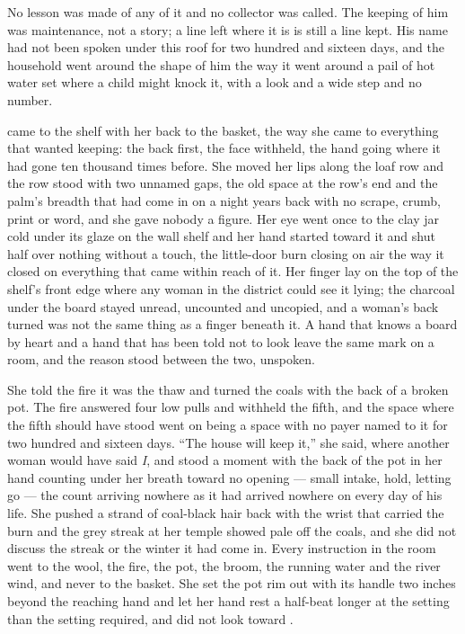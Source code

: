 No lesson was made of any of it and no collector was called. The keeping of him was maintenance, not a story; a line left where it is is still a line kept. His name had not been spoken under this roof for two hundred and sixteen days, and the household went around the shape of him the way it went around a pail of hot water set where a child might knock it, with a look and a wide step and no number.

\scenebreak

 came to the shelf with her back to the basket, the way she came to everything that wanted keeping: the back first, the face withheld, the hand going where it had gone ten thousand times before. She moved her lips along the loaf row and the row stood with two unnamed gaps, the old space at the row's end and the palm's breadth that had come in on a night years back with no scrape, crumb, print or word, and she gave nobody a figure. Her eye went once to the clay jar cold under its glaze on the wall shelf and her hand started toward it and shut half over nothing without a touch, the little-door burn closing on air the way it closed on everything that came within reach of it. Her finger lay on the top of the shelf's front edge where any woman in the district could see it lying; the charcoal under the board stayed unread, uncounted and uncopied, and a woman's back turned was not the same thing as a finger beneath it. A hand that knows a board by heart and a hand that has been told not to look leave the same mark on a room, and the reason stood between the two, unspoken.

She told the fire it was the thaw and turned the coals with the back of a broken pot. The fire answered four low pulls and withheld the fifth, and the space where the fifth should have stood went on being a space with no payer named to it for two hundred and sixteen days. “The house will keep it,” she said, where another woman would have said \emph{I}, and stood a moment with the back of the pot in her hand counting under her breath toward no opening --- small intake, hold, letting go --- the count arriving nowhere as it had arrived nowhere on every day of his life. She pushed a strand of coal-black hair back with the wrist that carried the burn and the grey streak at her temple showed pale off the coals, and she did not discuss the streak or the winter it had come in. Every instruction in the room went to the wool, the fire, the pot, the broom, the running water and the river wind, and never to the basket. She set the pot rim out with its handle two inches beyond the reaching hand and let her hand rest a half-beat longer at the setting than the setting required, and did not look toward .


